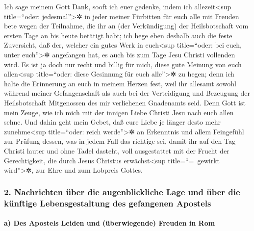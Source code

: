  Ich sage meinem Gott Dank, sooft ich euer gedenke,
 indem ich allezeit\textless sup title=``oder:
jedesmal''\textgreater✲ in jeder meiner Fürbitten für euch alle mit
Freuden bete  wegen der Teilnahme, die ihr an (der
Verkündigung) der Heilsbotschaft vom ersten Tage an bis heute betätigt
habt;  ich hege eben deshalb auch die feste Zuversicht,
daß der, welcher ein gutes Werk in euch\textless sup title=``oder: bei
euch, unter euch''\textgreater✲ angefangen hat, es auch bis zum Tage
Jesu Christi vollenden wird.  Es ist ja doch nur recht und
billig für mich, diese gute Meinung von euch allen\textless sup
title=``oder: diese Gesinnung für euch alle''\textgreater✲ zu hegen;
denn ich halte die Erinnerung an euch in meinem Herzen fest, weil ihr
allesamt sowohl während meiner Gefangenschaft als auch bei der
Verteidigung und Bezeugung der Heilsbotschaft Mitgenossen des mir
verliehenen Gnadenamts seid.  Denn Gott ist mein Zeuge,
wie ich mich mit der innigen Liebe Christi Jesu nach euch allen sehne.
 Und dahin geht mein Gebet, daß eure Liebe je länger desto
mehr zunehme\textless sup title=``oder: reich werde''\textgreater✲ an
Erkenntnis und allem Feingefühl  zur Prüfung dessen, was
in jedem Fall das richtige sei, damit ihr auf den Tag Christi lauter und
ohne Tadel dasteht,  voll ausgestattet mit der Frucht der
Gerechtigkeit, die durch Jesus Christus erwächst\textless sup
title=``=~gewirkt wird''\textgreater✲, zur Ehre und zum Lobpreis Gottes.

\hypertarget{nachrichten-uxfcber-die-augenblickliche-lage-und-uxfcber-die-kuxfcnftige-lebensgestaltung-des-gefangenen-apostels}{%
\subsubsection{2. Nachrichten über die augenblickliche Lage und über die
künftige Lebensgestaltung des gefangenen
Apostels}\label{nachrichten-uxfcber-die-augenblickliche-lage-und-uxfcber-die-kuxfcnftige-lebensgestaltung-des-gefangenen-apostels}}

\hypertarget{a-des-apostels-leiden-und-uxfcberwiegende-freuden-in-rom}{%
\paragraph{a) Des Apostels Leiden und (überwiegende) Freuden in
Rom}\label{a-des-apostels-leiden-und-uxfcberwiegende-freuden-in-rom}}

